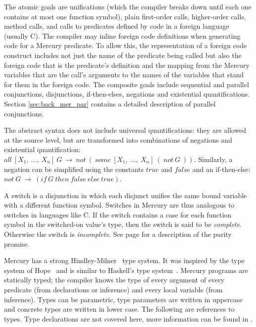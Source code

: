 \noindent
The atomic goals are unifications
(which the compiler breaks down until each one contains
at most one function symbol),
plain first-order calls,
higher-order calls,
method calls,
and calls to predicates defined by code in a foreign language (usually C).
The compiler may inline foreign code definitions when generating code
for a Mercury predicate.
To allow this, the representation of a foreign code construct includes
not just the name of the predicate being called
but also the foreign code that is the predicate's definition
and the mapping from the Mercury variables that are the call's arguments
to the names of the variables that stand for them in the foreign code.
The composite goals include
sequential and parallel conjunctions,
disjunctions, if-then-elses, negations and existential quantifications.
Section \ref{sec:back_mer_par} contains a detailed description of parallel
conjunctions.

The abstract syntax does not include universal quantifications:
they are allowed at the source level,
but are transformed into combinations of negations and existential quantification:
$all~[X_1,~\ldots,~X_n]~G~\rightarrow~not~(~some~[X_1,~\ldots,~X_n]~(~not~G~))$.
Similarly,
a negation can be simplified using the constants $true$ and $false$ and an
if-then-else:
$not~G~\rightarrow~(if~G~then~false~else~true)$.

A switch is a disjunction in which
each disjunct unifies the same bound variable
with a different function symbol.
Switches in Mercury are thus analogous to switches in languages like C.
If the switch contains a case for each function symbol in the
switched-on value's type, then the switch is said to be \emph{complete}.
Otherwise the switch is \emph{incomplete}.
See page \pageref{page:purity} for a description of the purity promise.

Mercury has a strong Hindley-Milner~\citep{hindley69:types,milner78:types} type
system.
It was inspired by the type system of Hope~\citep{hope_types}
and is similar to Haskell's type system~\citep{haskell98}.
Mercury programs are statically typed; the compiler knows the type of every
argument of every predicate (from declarations or inference) and every local
variable (from inference).
Types can be parametric,
type parameters are written in uppercase and
concrete types are written in lower case.
The following are references to types.
Type declarations are not covered here,
more information can be found in \citet{mercury_refman}.

